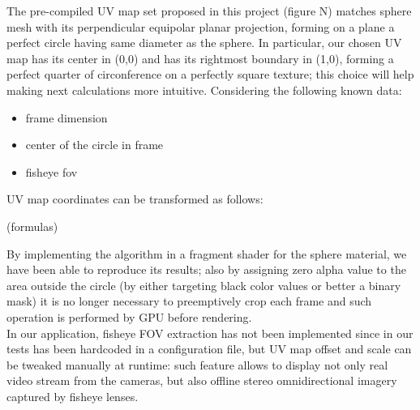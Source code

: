 The pre-compiled UV map set proposed in this project (figure N) matches sphere mesh with its perpendicular equipolar planar projection, forming on a plane a perfect circle having same diameter as the sphere. In particular, our chosen UV map has its center in (0,0) and has its rightmost boundary in (1,0), forming a perfect quarter of circonference on a perfectly square texture; this choice will help making next calculations more intuitive. Considering the following known data:
\begin{itemize}
\item frame dimension
\item center of the circle in frame
\item fisheye fov
\end{itemize}
UV map coordinates can be transformed as follows:

(formulas)

By implementing the algorithm in a fragment shader for the sphere material, we have been able to reproduce its results; also by assigning zero alpha value to the area outside the circle (by either targeting black color values or better a binary mask) it is no longer necessary to preemptively crop each frame and such operation is performed by GPU before rendering.\\
In our application, fisheye FOV extraction has not been implemented since in our tests has been hardcoded in a configuration file, but UV map offset and scale can be tweaked manually at runtime: such feature allows to display not only real video stream from the cameras, but also offline stereo omnidirectional imagery captured by fisheye lenses.

